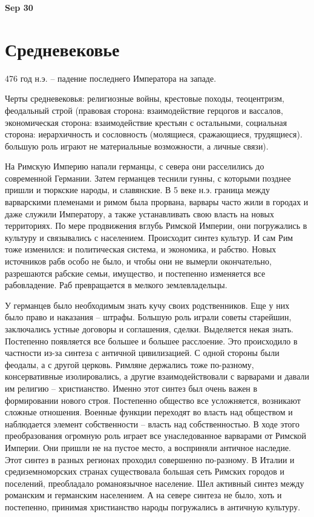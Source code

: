 \documentclass[a4paper, 12pt]{article}
\def\dateis#1{\vspace{\baselineskip}\hfill\textbf{#1}\par}
\begin{document}
\begin{multicols}{2}
\dateis{Sep 30}

\section{Средневековье}

476 год н.э. -- падение последнего Императора на западе. 

Черты средневековья: религиозные войны, крестовые походы, теоцентризм, феодальный строй (правовая сторона: взаимодействие герцогов и вассалов, экономическая сторона: взаимодействие крестьян с остальными, социальная сторона: иерархичность и сословность (молящиеся, сражающиеся, трудящиеся). большую роль играют не материальные возможности, а личные связи). 

На Римскую Империю напали германцы, с севера они расселились до современной Германии. Затем германцев теснили гунны, с которыми позднее пришли и тюркские народы, и славянские. В 5 веке н.э. граница между варварскими племенами и римом была прорвана, варвары часто жили в городах и даже служили Императору, а также устанавливать свою власть на новых территориях. По мере продвижения вглубь Римской Империи, они погружались в культуру и связывались с населением. Происходит синтез культур. И сам Рим тоже изменился: и политическая система, и экономика, и рабство. Новых источников рабв особо не было, и чтобы они не вымерли окончательно, разрешаются рабские семьи, имущество, и постепенно изменяется все рабовладение. Раб превращается в мелкого землевладельцы. 

У германцев было необходимым знать кучу своих родственников. Еще у них было право и наказания -- штрафы. Большую роль играли советы старейшин, заключались устные договоры и соглашения, сделки. Выделяется некая знать. Постепенно появляется все большее и большее расслоение. Это происходило в частности из-за синтеза с античной цивилизацией. С одной стороны были феодалы, а с другой церковь. Римляне держались тоже по-разному, консервативные изолировались, а другие взаимодействовали с варварами и давали им религию -- христианство. Именно этот синтез был очень важен в формировании нового строя. Постепенно общество все усложняется, возникают сложные отношения. Военные функции переходят во власть над обществом и наблюдается элемент собственности -- власть над собственностью. В ходе этого преобразования огромную роль играет все унаследованное варварами от Римской Империи. Они пришли не на пустое место, а восприняли античное наследие. Этот синтез в разных регионах проходил совершенно по-разному. В Италии и средиземноморских странах существовала большая сеть Римских городов и поселений, преобладало романоязычное население. Шел активный синтез между романским и германским населением. А на севере синтеза не было, хоть и постепенно, принимая христианство народы погружались в античную культуру. 


\end{multicols}
\end{document}
